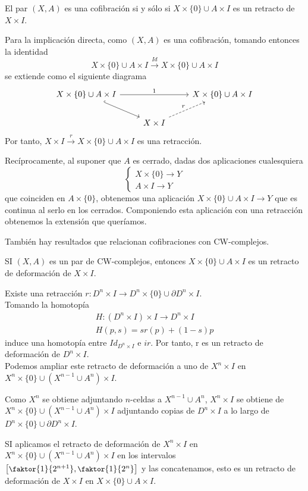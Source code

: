 \begin{teor}
El par $(X, A)$ es una cofibración si y sólo si $X \times \{0\} \cup A \times I$ es un retracto de $X \times I$.
\end{teor}
\begin{demo}
Para la implicación directa, como $(X,A)$ es una cofibración, tomando entonces la identidad 
\[ X \times \{0\} \cup A \times I \stackrel{Id}{\longrightarrow} X \times \{0\} \cup A \times I \]
se extiende como el siguiente diagrama
\[
\begin{tikzcd}
	X \times \{0\} \cup A \times I \arrow{rr}{1} \drar[hook] & & X \times \{0\} \cup A \times I \\
				& X \times I \urar[dashed]{r} &
\end{tikzcd}
\]
Por tanto, $X \times I \stackrel{r}{\longrightarrow} X \times \{0\} \cup A \times I$ es una retracción. \par
Recíprocamente, al suponer que $A$ es cerrado, dadas dos aplicaciones cualesquiera 
\[ \begin{cases}
X \times \{0\} \longrightarrow Y \\
A \times I \longrightarrow Y
\end{cases} \]
que coinciden en $A \times \{0\}$, obtenemos una aplicación $X \times \{0\} \cup A \times I \longrightarrow Y$ que es continua al serlo en los cerrados. Componiendo esta aplicación con una retracción obtenemos la extensión que queríamos.
\end{demo}
También hay resultados que relacionan cofibraciones con CW-complejos.
\begin{teor}
SI $(X, A)$ es un par de CW-complejos, entonces $X \times \{0\} \cup A \times I$ es un retracto de deformación de $X \times I$.
\end{teor}
\begin{demo}
Existe una retracción $r : D^n \times I \longrightarrow D^n \times \{0\} \cup \partial D^n \times I$. \\
Tomando la homotopía 
\begin{align*}
H : (D^n \times I) \times I \longrightarrow D^n \times I \\
H(p, s) = s r(p) + (1-s)p
\end{align*}
induce una homotopía entre $Id_{D^n \times I} $ e $ir$. Por tanto, r es un retracto de deformación de $D^n \times I$. \\
Podemos ampliar este retracto de deformación a uno de $X^n \times I$ en $X^n \times \{0\} \cup (X^{n-1} \cup A^n) \times I$. \par
Como $X^n$ se obtiene adjuntando $n$-celdas a $X^{n-1} \cup A^n$, $X^n \times I$ se obtiene de $X^n \times \{0\} \cup (X^{n-1} \cup A^n) \times I$ adjuntando copias de $D^n \times I$ a lo largo de $D^n \times \{0\} \cup \partial D^n \times I$. \par 
SI aplicamos el retracto de deformación de $X^n \times I$ en $X^n \times \{0\} \cup (X^{n-1} \cup A^n) \times I$ en los intervalos ${\small \left[\faktor{1}{2^{n+1}}, \faktor{1}{2^n}\right]}$ y las concatenamos, esto es un retracto de deformación de $X \times I$ en $X \times \{0\} \cup A \times I$.
\end{demo}

